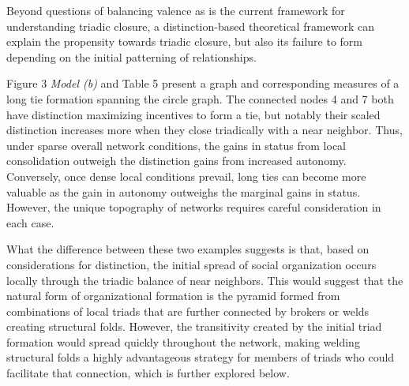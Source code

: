\documentclass[12pt]{article}
\begin{document}
Beyond questions of balancing valence as is the current framework for understanding triadic closure, a distinction-based theoretical framework can explain the propensity towards triadic closure, but also its failure to form depending on the initial patterning of relationships. 

Figure 3 \textit{Model (b)} and Table 5 present a graph and corresponding measures of a long tie formation spanning the circle graph. The connected nodes 4 and 7 both have distinction maximizing incentives to form a tie, but notably their scaled distinction increases more when they close triadically with a near neighbor. Thus, under sparse overall network conditions, the gains in status from local consolidation outweigh the distinction gains from increased autonomy. Conversely, once dense local conditions prevail, long ties can become more valuable as the gain in autonomy outweighs the marginal gains in status. However, the unique topography of networks requires careful consideration in each case.

What the difference between these two examples suggests is that, based on considerations for distinction, the initial spread of social organization occurs locally through the triadic balance of near neighbors. This would suggest that the natural form of organizational formation is the pyramid formed from combinations of local triads that are further connected by brokers or welds creating structural folds. However, the transitivity created by the initial triad formation would spread quickly throughout the network, making welding structural folds a highly advantageous strategy for members of triads who could facilitate that connection, which is further explored below.
\end{document}
